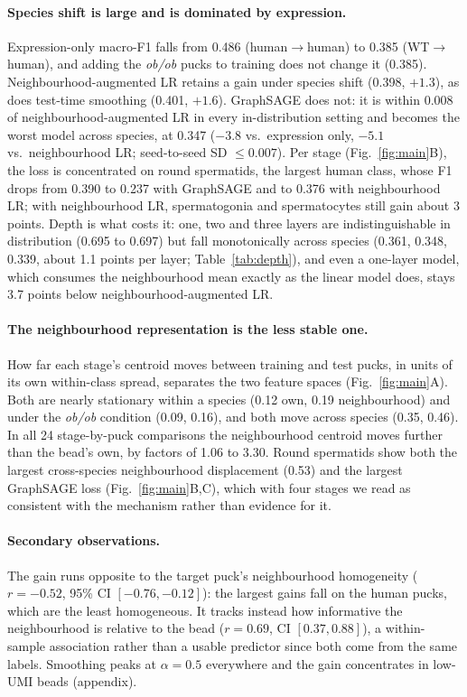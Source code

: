 \paragraph{Species shift is large and is dominated by expression.} Expression-only macro-F1 falls from 0.486 (human$\to$human) to 0.385 (WT$\to$human), and adding the \emph{ob/ob} pucks to training does not change it (0.385). Neighbourhood-augmented LR retains a gain under species shift (0.398, $+1.3$), as does test-time smoothing (0.401, $+1.6$). GraphSAGE does not: it is within 0.008 of neighbourhood-augmented LR in every in-distribution setting and becomes the worst model across species, at 0.347 ($-3.8$ vs.\ expression only, $-5.1$ vs.\ neighbourhood LR; seed-to-seed SD $\le 0.007$). Per stage (Fig.~\ref{fig:main}B), the loss is concentrated on round spermatids, the largest human class, whose F1 drops from 0.390 to 0.237 with GraphSAGE and to 0.376 with neighbourhood LR; with neighbourhood LR, spermatogonia and spermatocytes still gain about 3 points. Depth is what costs it: one, two and three layers are indistinguishable in distribution (0.695 to 0.697) but fall monotonically across species (0.361, 0.348, 0.339, about 1.1 points per layer; Table~\ref{tab:depth}), and even a one-layer model, which consumes the neighbourhood mean exactly as the linear model does, stays 3.7 points below neighbourhood-augmented LR.

\paragraph{The neighbourhood representation is the less stable one.} How far each stage's centroid moves between training and test pucks, in units of its own within-class spread, separates the two feature spaces (Fig.~\ref{fig:main}A). Both are nearly stationary within a species (0.12 own, 0.19 neighbourhood) and under the \emph{ob/ob} condition (0.09, 0.16), and both move across species (0.35, 0.46). In all 24 stage-by-puck comparisons the neighbourhood centroid moves further than the bead's own, by factors of 1.06 to 3.30. Round spermatids show both the largest cross-species neighbourhood displacement (0.53) and the largest GraphSAGE loss (Fig.~\ref{fig:main}B,C), which with four stages we read as consistent with the mechanism rather than evidence for it.

\paragraph{Secondary observations.} The gain runs opposite to the target puck's neighbourhood homogeneity ($r=-0.52$, 95\% CI $[-0.76,-0.12]$): the largest gains fall on the human pucks, which are the least homogeneous. It tracks instead how informative the neighbourhood is relative to the bead ($r=0.69$, CI $[0.37,0.88]$), a within-sample association rather than a usable predictor since both come from the same labels. Smoothing peaks at $\alpha=0.5$ everywhere and the gain concentrates in low-UMI beads (appendix).

